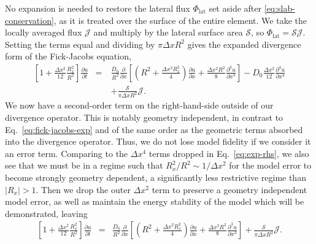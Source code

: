\documentclass[11pt]{article}
\begin{document}
No expansion is needed to restore the lateral flux $\Phi_{\mathrm{lat}}$ set aside after \eqref{eq:slab-conservation}, as it is treated over the surface of the entire element. We take the locally averaged flux $\mathcal{J}$ and multiply by the lateral surface area $\mathcal{S}$, so $\Phi_{\mathrm{lat}} = \mathcal{S}\mathcal{J}$. Setting the terms equal and dividing by $\pi \Delta x R^2$ gives the expanded divergence form of the Fick-Jacobs equation,
\begin{eqnarray}
     \left[ 1 + \frac{\Delta x^2}{12} \frac{R_x^2}{R^2} \right] \frac{\partial u}{\partial t} &=& \frac{D_0}{R^2}  \frac{\partial}{\partial x} \left[ \left( R^2 + \frac{\Delta x^2 R_x^2}{4} \right) \frac{\partial u}{\partial x} + \frac{\Delta x^2 R^2}{8} \frac{\partial^3 u}{\partial x^3} \right] - D_0 \frac{\Delta x^2}{12} \frac{\partial^4 u}{\partial x^4} \\
    &\quad& +  \frac{\mathcal{S}}{\pi\Delta x R^2} \mathcal{J}. \nonumber
\end{eqnarray}
We now have a second-order term on the right-hand-side outside of our divergence operator. This is notably geometry independent, in contrast to Eq.~\eqref{eq:fick-jacobs-exp} and of the same order as the geometric terms absorbed into the divergence operator. Thus, we do not lose model fidelity if we consider it an error term. Comparing to the $\Delta x^4$ terms dropped in Eq.~\eqref{eq:exp-rhs}, we also see that we must be in a regime such that $R_x^2/R^2 \sim 1/\Delta x^2$ for the model error to become strongly geometry dependent, a significantly less restrictive regime than $|R_x| > 1$. Then we drop the outer $\Delta x^2$ term to preserve a geometry independent model error, as well as maintain the energy stability of the model which will be demonstrated, leaving
\begin{eqnarray}
     \left[ 1 + \frac{\Delta x^2}{12} \frac{R_x^2}{R^2} \right] \frac{\partial u}{\partial t} &=& \frac{D_0}{R^2}  \frac{\partial}{\partial x} \left[ \left( R^2 + \frac{\Delta x^2 R_x^2}{4} \right) \frac{\partial u}{\partial x} + \frac{\Delta x^2 R^2}{8} \frac{\partial^3 u}{\partial x^3} \right] +  \frac{\mathcal{S}}{\pi\Delta x R^2} \mathcal{J}.
\end{eqnarray}
\end{document}
